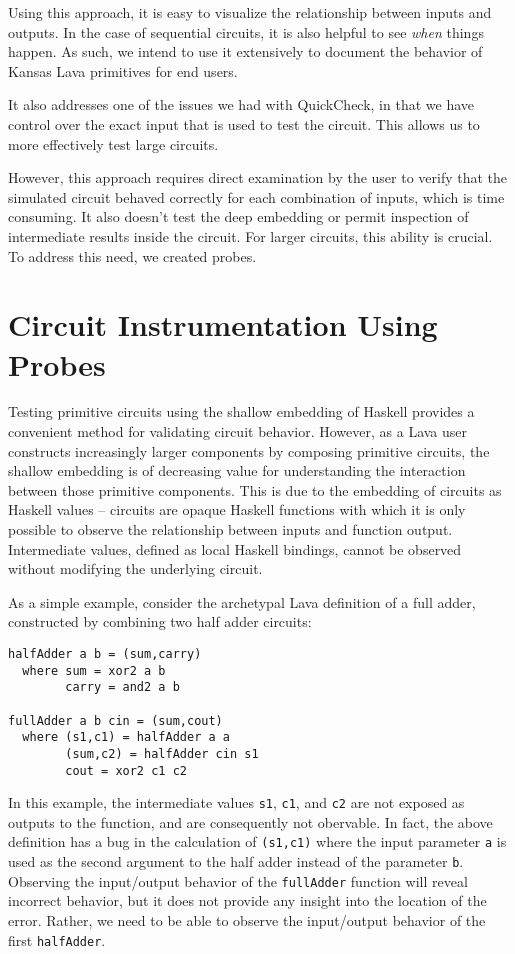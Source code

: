 \documentclass{llncs}
\begin{document}
Using this approach, it is easy to visualize the relationship
between inputs and outputs. In the case of sequential circuits, it is also
helpful to see \emph{when} things happen. As such, we intend to use it
extensively to document the behavior of Kansas Lava primitives for end users.

It also addresses one of the issues we had with QuickCheck, in that we have
control over the exact input that is used to test the circuit. This allows
us to more effectively test large circuits.

However, this approach requires direct examination by the user to verify that the
simulated circuit behaved correctly for each combination of inputs, which
is time consuming. It also doesn't test the deep embedding or permit
inspection of intermediate results inside the circuit. For larger circuits, this
ability is crucial. To address this need, we created probes.

\section{Circuit Instrumentation Using Probes}
\label{sec:probes}

Testing primitive circuits using the shallow embedding of Haskell provides a
convenient method for validating circuit behavior. However, as a Lava user
constructs increasingly larger components by composing primitive circuits, the shallow
embedding is of decreasing value for understanding the interaction between
those primitive components. This is due to the embedding of circuits as Haskell
values -- circuits are opaque Haskell functions with which it is only possible
to observe the relationship between inputs and function output. Intermediate
values, defined as local Haskell bindings, cannot be observed without modifying
the underlying circuit.

As a simple example, consider the archetypal Lava definition of a full adder,
constructed by combining two half adder circuits:

\begin{verbatim}
halfAdder a b = (sum,carry)
  where sum = xor2 a b
        carry = and2 a b

fullAdder a b cin = (sum,cout)
  where (s1,c1) = halfAdder a a
        (sum,c2) = halfAdder cin s1
        cout = xor2 c1 c2
\end{verbatim}

In this example, the intermediate values \verb!s1!, \verb!c1!, and \verb!c2! are
not exposed as outputs to the function, and are consequently not
obervable. In fact, the above definition has a bug in the calculation of
\verb!(s1,c1)! where the input parameter \verb!a! is used as the second argument
to the half adder instead of the parameter \verb!b!. Observing the input/output
behavior of the \verb!fullAdder! function will reveal incorrect behavior, but it
does not provide any insight into the location of the error. Rather, we need to
be able to observe the input/output behavior of the first \verb!halfAdder!.
\end{document}
